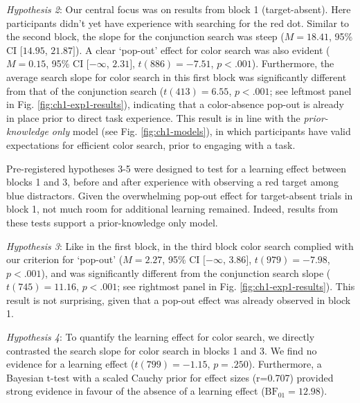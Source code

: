 \documentclass[12pt,twoside]{reedthesis}
\begin{document}
\emph{Hypothesis 2}: Our central focus was on results from block 1 (target-absent). Here participants didn't yet have experience with searching for the red dot. Similar to the second block, the slope for the conjunction search was steep (\(M = 18.41\), 95\% CI \([14.95\), \(21.87]\)). A clear `pop-out' effect for color search was also evident (\(M = 0.15\), 95\% CI \([-\infty\), \(2.31]\), \(t(886) = -7.51\), \(p < .001\)). Furthermore, the average search slope for color search in this first block was significantly different from that of the conjunction search (\(t(413) = 6.55\), \(p < .001\); see leftmost panel in Fig. \ref{fig:ch1-exp1-results}), indicating that a color-absence pop-out is already in place prior to direct task experience. This result is in line with the \emph{prior-knowledge only} model (see Fig. \ref{fig:ch1-models}), in which participants have valid expectations for efficient color search, prior to engaging with a task.

Pre-registered hypotheses 3-5 were designed to test for a learning effect between blocks 1 and 3, before and after experience with observing a red target among blue distractors. Given the overwhelming pop-out effect for target-absent trials in block 1, not much room for additional learning remained. Indeed, results from these tests support a prior-knowledge only model.

\emph{Hypothesis 3}: Like in the first block, in the third block color search complied with our criterion for `pop-out' (\(M = 2.27\), 95\% CI \([-\infty\), \(3.86]\), \(t(979) = -7.98\), \(p < .001\)), and was significantly different from the conjunction search slope (\(t(745) = 11.16\), \(p < .001\); see rightmost panel in Fig. \ref{fig:ch1-exp1-results}). This result is not surprising, given that a pop-out effect was already observed in block 1.

\emph{Hypothesis 4}: To quantify the learning effect for color search, we directly contrasted the search slope for color search in blocks 1 and 3. We find no evidence for a learning effect (\(t(799) = -1.15\), \(p = .250\)). Furthermore, a Bayesian t-test with a scaled Cauchy prior for effect sizes (r=0.707) provided strong evidence in favour of the absence of a learning effect (\(\mathrm{BF}_{\textrm{01}} = 12.98\)).
\end{document}
